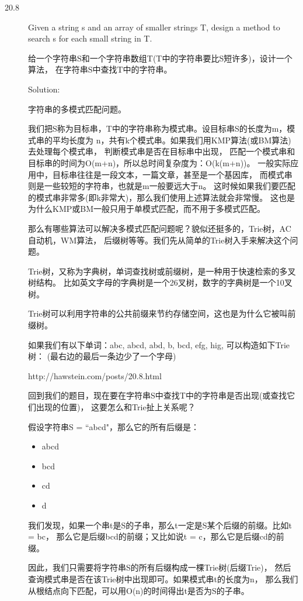 \begin{description}
\item[20.8] Given a string s and an array of smaller strings T, design a method to search s for each small string in T.

给一个字符串S和一个字符串数组T(T中的字符串要比S短许多)，设计一个算法， 在字符串S中查找T中的字符串。

Solution:

字符串的多模式匹配问题。

我们把S称为目标串，T中的字符串称为模式串。设目标串S的长度为m，模式串的平均长度为 n，共有k个模式串。如果我们用KMP算法(或BM算法)去处理每个模式串， 判断模式串是否在目标串中出现， 匹配一个模式串和目标串的时间为O(m+n)，所以总时间复杂度为：O(k(m+n))。 一般实际应用中，目标串往往是一段文本，一篇文章，甚至是一个基因库， 而模式串则是一些较短的字符串，也就是m一般要远大于n。 这时候如果我们要匹配的模式串非常多(即k非常大)，那么我们使用上述算法就会非常慢。 这也是为什么KMP或BM一般只用于单模式匹配，而不用于多模式匹配。

那么有哪些算法可以解决多模式匹配问题呢？貌似还挺多的，Trie树，AC自动机，WM算法， 后缀树等等。我们先从简单的Trie树入手来解决这个问题。

Trie树，又称为字典树，单词查找树或前缀树，是一种用于快速检索的多叉树结构。 比如英文字母的字典树是一个26叉树，数字的字典树是一个10叉树。

Trie树可以利用字符串的公共前缀来节约存储空间，这也是为什么它被叫前缀树。

如果我们有以下单词：abc, abcd, abd, b, bcd, efg, hig, 可以构造如下Trie树： (最右边的最后一条边少了一个字母)

http://hawstein.com/posts/20.8.html

回到我们的题目，现在要在字符串S中查找T中的字符串是否出现(或查找它们出现的位置)， 这要怎么和Trie扯上关系呢？

假设字符串S = “abcd"，那么它的所有后缀是：
\begin{itemize}
  \itemsep=-3pt
\item abcd
\item bcd
\item cd
\item d
\end{itemize}
我们发现，如果一个串t是S的子串，那么t一定是S某个后缀的前缀。比如t = bc， 那么它是后缀bcd的前缀；又比如说t = c，那么它是后缀cd的前缀。

因此，我们只需要将字符串S的所有后缀构成一棵Trie树(后缀Trie)， 然后查询模式串是否在该Trie树中出现即可。如果模式串t的长度为n， 那么我们从根结点向下匹配，可以用O(n)的时间得出t是否为S的子串。


\end{description}
